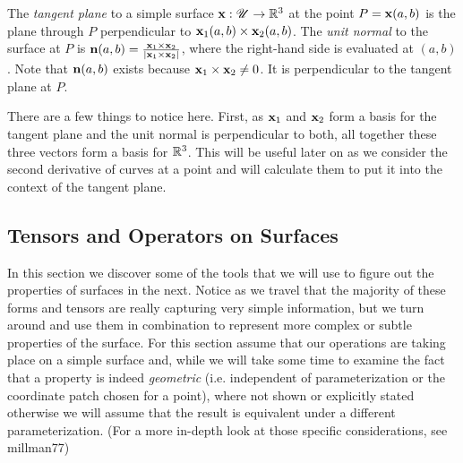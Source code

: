 
\begin{defn}
  The \emph{tangent plane} to a simple surface  $\mathbf{x}: \mathscr{U} \to \mathbb{R}^3$ at the point $P = \mathbf{x}(a, b)$ is the plane through $P$ perpendicular to $\mathbf{x}_1(a, b) \times \mathbf{x}_2(a, b)$. The \emph{unit normal} to the surface at $P$ is $\mathbf{n}(a, b) = \frac{\mathbf{x}_1 \times \mathbf{x}_2}{\left|\mathbf{x}_1 \times \mathbf{x}_2\right|}$, where the right-hand side is evaluated at $(a, b)$. Note that $\mathbf{n}(a, b)$ exists because $\mathbf{x}_1 \times \mathbf{x}_2 \neq 0$. It is perpendicular to the tangent plane at $P$.
\end{defn}

\begin{unno_rem}
  There are a few things to notice here. First, as $\mathbf{x}_1$ and $\mathbf{x}_2$ form a basis for the tangent plane and the unit normal is perpendicular to both, all together these three vectors form a basis for $\mathbb{R}^3$. This will be useful later on as we consider the second derivative of curves at a point and will calculate them to put it into the context of the tangent plane.
\end{unno_rem}

\subsection{Tensors and Operators on Surfaces}

In this section we discover some of the tools that we will use to figure out the properties of surfaces in the next. Notice as we travel that the majority of these forms and tensors are really capturing very simple information, but we turn around and use them in combination to represent more complex or subtle properties of the surface. For this section assume that our operations are taking place on a simple surface and, while we will take some time to examine the fact that a property is indeed \emph{geometric} (i.e. independent of parameterization or the coordinate patch chosen for a point), where not shown or explicitly stated otherwise we will assume that the result is equivalent under a different parameterization. (For a more in-depth look at those specific considerations, see millman77)

